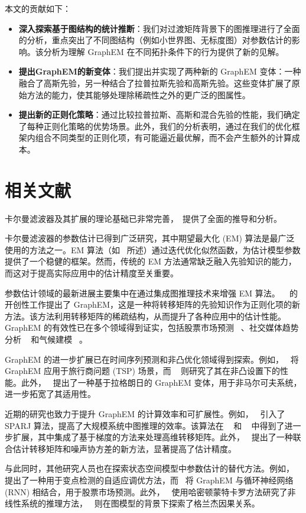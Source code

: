 本文的贡献如下：
\begin{itemize}
    \item \textbf{深入探索基于图结构的统计推断}：我们对过渡矩阵背景下的图推理进行了全面的分析，重点突出了不同图结构（例如小世界图、无标度图）对参数估计的影响。该分析为理解 GraphEM 在不同拓扑条件下的行为提供了新的见解。
    \item \textbf{提出GraphEM的新变体}：我们提出并实现了两种新的 GraphEM 变体：一种融合了高斯先验，另一种结合了拉普拉斯先验和高斯先验。这些变体扩展了原始方法的能力，使其能够处理除稀疏性之外的更广泛的图属性。
    \item \textbf{提出新的正则化策略}：通过比较拉普拉斯、高斯和混合先验的性能，我们确定了每种正则化策略的优势场景。此外，我们的分析表明，通过在我们的优化框架内组合不同类型的正则化项，有可能逼近最优解，而不会产生额外的计算成本。
\end{itemize}

\section{相关文献}
卡尔曼滤波器及其扩展的理论基础已非常完善，~\cite{Särkkä_Svensson_2023_textbook}提供了全面的推导和分析。

卡尔曼滤波器的参数估计已得到广泛研究，其中期望最大化 (EM) 算法是最广泛使用的方法之一。EM 算法（如~\cite{Särkkä_Svensson_2023_textbook} 所述）通过迭代优化似然函数，为估计模型参数提供了一个稳健的框架。然而，传统的 EM 方法通常缺乏融入先验知识的能力，而这对于提高实际应用中的估计精度至关重要。

参数估计领域的最新进展主要集中在通过集成图推理技术来增强 EM 算法。 ~\cite{chouzenoux2020GraphEM} 的开创性工作提出了 GraphEM，这是一种将转移矩阵的先验知识作为正则化项的新方法。该方法利用转移矩阵的稀疏结构，从而提升了各种应用中的估计性能。GraphEM 的有效性已在多个领域得到证实，包括股票市场预测 ~\cite{sharma2021stock_prediction}、社交媒体趋势分析 ~\cite{dahiya2021twitter_prediction} 和气候建模 ~\cite{elvira2023GraphEM_in_climate}。

GraphEM 的进一步扩展已在时间序列预测和非凸优化领域得到探索。例如，~\cite{elvira2022GraphEM_TSP} 将 GraphEM 应用于旅行商问题 (TSP) 场景，而 ~\cite{chouzenoux2023graph_it} 则研究了其在非凸设置下的性能。此外，~\cite{chouzenoux2024non_markov_lagrangeEM} 提出了一种基于拉格朗日的 GraphEM 变体，用于非马尔可夫系统，进一步拓宽了其适用性。

近期的研究也致力于提升 GraphEM 的计算效率和可扩展性。例如，~\cite{cox2022sparj_alg_journal} 引入了 SPARJ 算法，提高了大规模系统中图推理的效率。该算法在 ~\cite{cox2023sparj_alg} 和 ~\cite{cox2024graphgrad_TSP} 中得到了进一步扩展，其中集成了基于梯度的方法来处理高维转移矩阵。此外，~\cite{chouzenoux2024DGLASSO} 提出了一种联合估计转移矩阵和噪声协方差的新方法，显著提高了估计精度。

与此同时，其他研究人员也在探索状态空间模型中参数估计的替代方法。例如，~\cite{tsampourakis2022alr_changepoint} 提出了一种用于变点检测的自适应调优方法，而~\cite{sharma2023stock_later} 将 GraphEM 与循环神经网络 (RNN) 相结合，用于股票市场预测。此外，~\cite{cui2024inference_non_linear} 使用哈密顿蒙特卡罗方法研究了非线性系统的推理方法，~\cite{mohanty2025iclr_granger} 则在图模型的背景下探索了格兰杰因果关系。